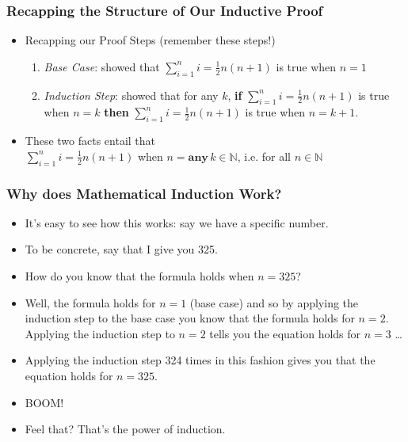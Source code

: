 \begin{frame}
\frametitle{Recapping the Structure of Our Inductive Proof}

\begin{itemize}[<+->]

\item Recapping our Proof Steps (remember these steps!)

\begin{enumerate}

\item \emph{Base Case}: showed that $\displaystyle\sum_{i=1}^n i = \frac{1}{2}n(n+1)$ is true when $n=1$

\item \emph{Induction Step}: showed that for any $k$, {\bf{if}} $\displaystyle\sum_{i=1}^n i = \frac{1}{2}n(n+1)$ is true when $n = k$ {\bf{then}} 
$\displaystyle\sum_{i=1}^n i = \frac{1}{2}n(n+1)$ is true when $n = k+1$.

\end{enumerate}

\item These two facts entail that\\
 $\displaystyle\sum_{i=1}^n i = \frac{1}{2}n(n+1)$ when $n = {\textbf{any}}\,  k \in \mathbb{N}$, i.e. for all  $n \in \mathbb{N}$
 
\end{itemize} 
\end{frame}

 \begin{frame}
\frametitle{Why does Mathematical Induction Work?}

\begin{itemize}[<+->]
\item It's easy to see how this works: say we have a specific number. 

\bi 
\item To be concrete, say that I give you 325. 

\item How do you know that the formula holds when $n = 325$? 

\ei 

\item Well, the formula holds for $n=1$ (base case) and so by applying the induction step to the base case you know that the formula holds for $n=2$. Applying the induction step to $n=2$ tells you the equation holds for $n=3$ \ldots

\item Applying the induction step 324 times in this fashion gives you that the equation holds for $n=325$. 

 \item BOOM! 
 
 \bi 
 \item Feel that? That's the power of induction.  
 \ei 
 
 \end{itemize} 
\end{frame}



